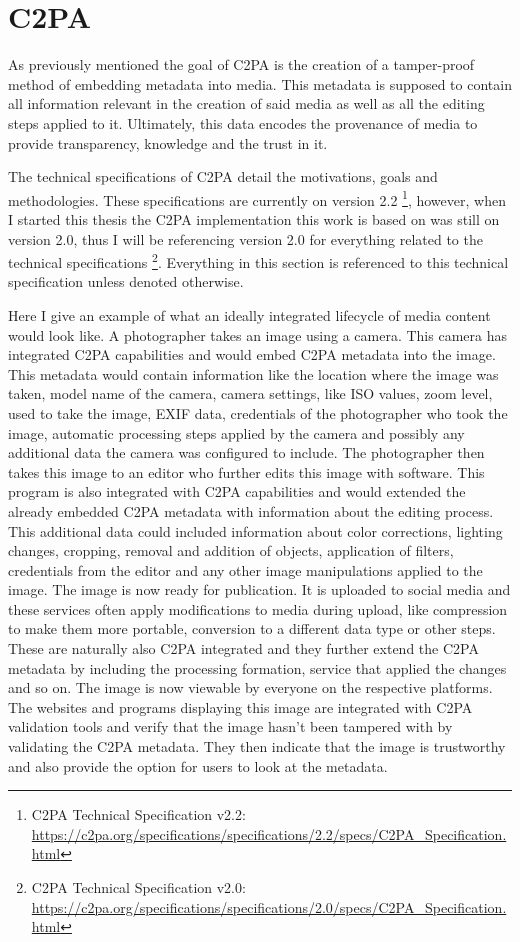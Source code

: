 \section{C2PA\label{c2pa}}

As previously mentioned the goal of C2PA is the creation of a tamper-proof method of embedding metadata into media. This metadata is supposed to contain all information relevant in the creation of said media as well as all the editing steps applied to it. Ultimately, this data encodes the provenance of media to provide transparency, knowledge and the trust in it.

The technical specifications of C2PA detail the motivations, goals and methodologies. These specifications are currently on version 2.2 \footnote{C2PA Technical Specification v2.2: \url{https://c2pa.org/specifications/specifications/2.2/specs/C2PA_Specification.html}}, however, when I started this thesis the C2PA implementation this work is based on was still on version 2.0, thus I will be referencing version 2.0 for everything related to the technical specifications \footnote{C2PA Technical Specification v2.0: \url{https://c2pa.org/specifications/specifications/2.0/specs/C2PA_Specification.html}}. Everything in this section is referenced to this technical specification unless denoted otherwise.

Here I give an example of what an ideally integrated lifecycle of media content would look like. A photographer takes an image using a camera. This camera has integrated C2PA capabilities and would embed C2PA metadata into the image. This metadata would contain information like the location where the image was taken, model name of the camera, camera settings, like ISO values, zoom level, used to take the image, EXIF data, credentials of the photographer who took the image, automatic processing steps applied by the camera and possibly any additional data the camera was configured to include. The photographer then takes this image to an editor who further edits this image with software. This program is also integrated with C2PA capabilities and would extended the already embedded C2PA metadata with information about the editing process. This additional data could included information about color corrections, lighting changes, cropping, removal and addition of objects, application of filters, credentials from the editor and any other image manipulations applied to the image. The image is now ready for publication. It is uploaded to social media and these services often apply modifications to media during upload, like compression to make them more portable, conversion to a different data type or other steps. These are naturally also C2PA integrated and they further extend the C2PA metadata by including the processing formation, service that applied the changes and so on. The image is now viewable by everyone on the respective platforms. The websites and programs displaying this image are integrated with C2PA validation tools and verify that the image hasn't been tampered with by validating the C2PA metadata. They then indicate that the image is trustworthy and also provide the option for users to look at the metadata.

